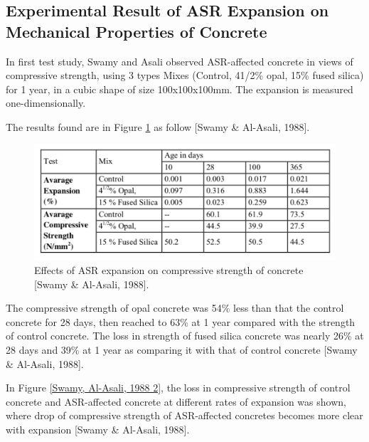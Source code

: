 \subsection{Experimental Result of ASR Expansion on Mechanical Properties of Concrete}

In first test study, Swamy and Asali observed ASR-affected concrete in views of compressive strength, using 3 types Mixes (Control, 41/2\% opal, 15\% fused silica) for 1 year, in a cubic shape of size 100x100x100mm. The expansion is measured one-dimensionally.

The results found are in Figure \ref{Swamy1} as follow [Swamy \& Al-Asali, 1988].

\begin{figure}[h!]
  \centering
  \includegraphics[width=0.8\linewidth]{Reference/temp3.png}
  \caption{Effects of ASR expansion on compressive strength of concrete [Swamy \& Al-Asali, 1988].}
  \label{Swamy1}
\end{figure}


The compressive strength of opal concrete was 54\% less than that the control concrete for 28 days, then reached to 63\% at 1 year compared with the strength of control concrete. The loss in strength of fused silica concrete was nearly 26\% at 28 days and 39\% at 1 year as comparing it with that of control concrete [Swamy \& Al-Asali, 1988].

In Figure \ref{Swamy, Al-Asali, 1988 2}, the loss in compressive strength of control concrete and ASR-affected concrete at different rates of expansion was shown, where drop of compressive strength of ASR-affected concretes becomes more clear with expansion [Swamy \& Al-Asali, 1988].

